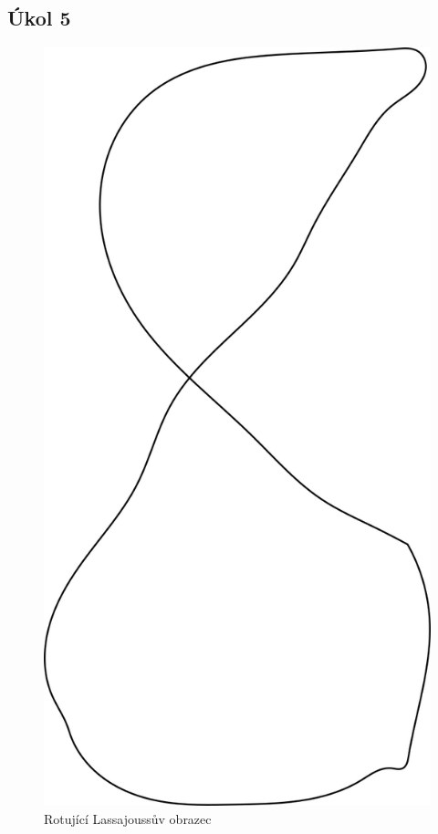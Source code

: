 \documentclass[5pt]{article}
\begin{document}
\subsection{Úkol 5}
\begin{figure}[htp]
\centering
\includegraphics[scale=0.35]{graph2.png}
\caption{Rotující Lassajoussův obrazec}
\label{}
\end{figure}
\end{document}
